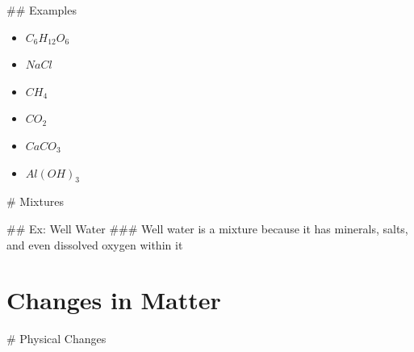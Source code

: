\documentclass[../../Main/main.tex]{subfiles}
\begin{document}
\begin{easylist}
	## Examples\\

	\begin{multicols}{2}

		\begin{itemize}
			\item \(C_{6}H_{12}O_{6}\)
			\item \(NaCl\)
			\item \(CH_{4}\)
			\item \(CO_{2}\)
			\item \(CaCO_3\)
			\item \(Al(OH)_3\)
		\end{itemize}
	\end{multicols}

	# Mixtures


	## Ex: Well Water
	### Well water is a mixture because it has minerals, salts, and even dissolved oxygen within it

	\section{Changes in Matter}

	# Physical Changes



\end{easylist}
\end{document}
